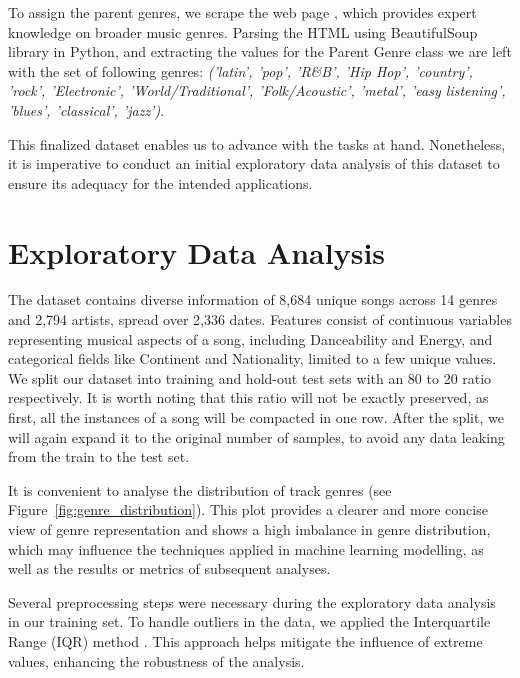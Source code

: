 \documentclass{article}
\begin{document}
To assign the parent genres, we scrape the web page \cite{ParentGenreSite}, which provides expert knowledge on broader music genres. Parsing the HTML using BeautifulSoup library in Python, and extracting the values for the Parent Genre class we are left with the set of following genres: \textit{('latin', 'pop', 'R\&B', 'Hip Hop', 'country', 'rock', 'Electronic', 'World/Traditional', 'Folk/Acoustic', 'metal', 'easy listening', 'blues', 'classical', 'jazz')}. 

This finalized dataset enables us to advance with the tasks at hand. Nonetheless, it is imperative to conduct an initial exploratory data analysis of this dataset to ensure its adequacy for the intended applications.

\section{Exploratory Data Analysis}


The dataset contains diverse information of 8,684 unique songs across 14 genres and 2,794 artists, spread over 2,336 dates. Features consist of continuous variables representing musical aspects of a song, including Danceability and Energy, and categorical fields like Continent and Nationality, limited to a few unique values. We split our dataset into training and hold-out test sets with an 80 to 20 ratio respectively. It is worth noting that this ratio will not be exactly preserved, as first, all the instances of a song will be compacted in one row. After the split, we will again expand it to the original number of samples, to avoid any data leaking \cite{Test_Training_Leakage} from the train to the test set.

It is convenient to analyse the distribution of track genres (see Figure~\ref{fig:genre_distribution}). This plot provides a clearer and more concise view of genre representation and shows a high imbalance in genre distribution, which may influence the techniques applied in machine learning modelling, as well as the results or metrics of subsequent analyses.

Several preprocessing steps were necessary during the exploratory data analysis in our training set.
To handle outliers in the data, we applied the Interquartile Range (IQR) method \cite{lane2003introduction}. This approach helps mitigate the influence of extreme values, enhancing the robustness of the analysis.
\end{document}
